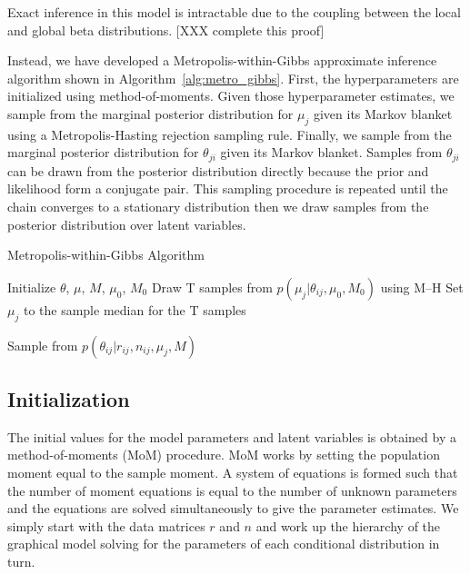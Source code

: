\documentclass[11pt,reqno]{amsart}
\begin{document}
Exact inference in this model is intractable due to the coupling between the local and global beta distributions. [XXX complete this proof] 

Instead, we have developed a Metropolis-within-Gibbs  approximate inference algorithm shown in Algorithm~\ref{alg:metro_gibbs}. First, the hyperparameters are initialized using method-of-moments. Given those hyperparameter estimates, we sample from the marginal posterior distribution for $\mu_j$ given its Markov blanket using a Metropolis-Hasting rejection sampling rule. Finally, we sample from the marginal posterior distribution for $\theta_{ji}$ given its Markov blanket. Samples from $\theta_{ji}$ can be drawn from the posterior distribution directly  because the prior and likelihood form a conjugate pair. This sampling procedure is repeated until the chain converges to a stationary distribution then we draw samples from the posterior distribution over latent variables.

\begin{algorithm}[ht]
\caption{Metropolis-within-Gibbs Algorithm}
\label{alg:metro_gibbs}
\begin{algorithmic}[1]

\State Initialize $\theta$, $\mu$, $M$, $\mu_0$, $M_0$
\Repeat
{} 
  \State Draw T samples from $p \left( \mu_j |\theta_{ij},\mu_0,M_0\right)$ using M--H
  \State Set $\mu_j$ to the sample median for the T samples
  
  
   
	\State Sample from $p \left( \theta_{ij} |r_{ij},n_{ij},\mu_j,M \right)$
  \EndFor

\EndFor
{}
\end{algorithmic}
\end{algorithm}

\subsection{Initialization}
The initial values for the model parameters and latent variables is obtained by a method-of-moments (MoM) procedure. MoM works by setting the population moment equal to the sample moment. A system of equations is formed such that the number of moment equations is equal to the number of unknown parameters and the equations are solved simultaneously to give the parameter estimates. We simply start with the data matrices $r$ and $n$ and work up the hierarchy of the graphical model solving for the parameters of each conditional distribution in turn.
\end{document}
